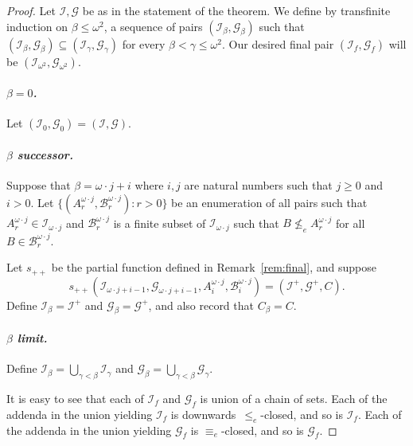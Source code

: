 \documentclass[11pt]{amsart}
\begin{document}
\begin{proof}
Let $\mathcal{I},\mathcal{G}$ be as in the statement of the theorem. We 
define by transfinite induction on $\beta \leq \omega^2$, a sequence of pairs 
$(\mathcal{I}_\beta, \mathcal{G}_\beta)$ such that $(\mathcal{I}_\beta, 
\mathcal{G}_\beta)\subseteq (\mathcal{I}_\gamma, \mathcal{G}_\gamma)$ for 
every $\beta < \gamma \leq \omega^2$. Our desired final pair $(\mathcal{I}_f, 
\mathcal{G}_f)$ will be $(\mathcal{I}_{\omega^2}, \mathcal{G}_{\omega^2})$. 

\medskip
\paragraph{\emph{$\beta=0$.}}
Let $(\mathcal{I}_0, \mathcal{G}_0)= (\mathcal{I}, \mathcal{G})$.

\medskip
\paragraph{\emph{$\beta$ successor.}} 
Suppose that $\beta=\omega\cdot j +i$ where $i,j$ are natural numbers such 
that $j \ge 0$ and $i>0$. Let $\{(A_r^{\omega \cdot j}, \mathcal{B}_r^{\omega 
\cdot j}): r>0\}$ be an enumeration of all pairs such that $A_r^{\omega \cdot 
j}\in \mathcal{I}_{\omega\cdot j}$ and $\mathcal{B}_r^{\omega \cdot j}$ is a 
finite subset of $\mathcal{I}_{\omega\cdot j}$ such that $B \nleq_e 
A_r^{\omega \cdot j}$ for all $B \in \mathcal{B}_r^{\omega \cdot j}$. 

Let $s_{++}$ be the partial function defined in Remark~\ref{rem:final}, and 
suppose 
\[
s_{++}(\mathcal{I}_{\omega\cdot j+i-1}, \mathcal{G}_{\omega\cdot j+i-1}, 
A_i^{\omega\cdot j},  \mathcal{B}_i^{\omega\cdot j}) 
= (\mathcal{I}^+, \mathcal{G}^+, C).
\]
Define $\mathcal{I}_{\beta} = \mathcal{I}^+$ and $\mathcal{G}_{\beta} = 
\mathcal{G}^+$, and also record that $C_\beta = C$.

\medskip
\paragraph{\emph{$\beta$ limit.}}
Define $\mathcal{I}_{\beta}= \bigcup_{\gamma < \beta} \mathcal{I}_{\gamma}$ 
and $\mathcal{G}_{\beta}= \bigcup_{\gamma < \beta} \mathcal{G}_{\gamma}$. 

\medskip

It is easy to see that each of $\mathcal{I}_f$ and $\mathcal{G}_f$ is union 
of a chain of sets. Each of the addenda in the union yielding $\mathcal{I}_f$ 
is downwards~$\le_e$-closed, and so is $\mathcal{I}_f$. Each of the addenda 
in the union yielding $\mathcal{G}_f$ is $\equiv_e$-closed, and so is 
$\mathcal{G}_f$. 


\end{proof}
\end{document}
